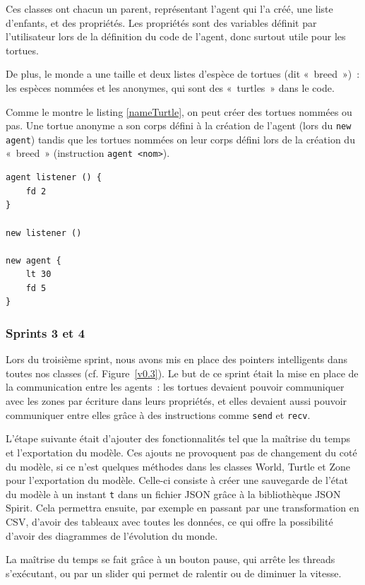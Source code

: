 Ces classes ont chacun un parent, représentant l'agent qui l'a créé, une liste d'enfants, et des propriétés. Les propriétés sont des variables définit par l'utilisateur lors de la définition du code de l'agent, donc surtout utile pour les tortues.

De plus, le monde a une taille et deux listes d'espèce de tortues (dit «~breed~»)~: les espèces nommées et les anonymes, qui sont des «~turtles~» dans le code.

Comme le montre le listing \ref{nameTurtle}, on peut créer des tortues nommées ou pas. Une tortue anonyme a son corps défini à la création de l'agent (lors du \verb|new agent|) tandis que les tortues nommées on leur corps défini lors de la création du «~breed~» (instruction \verb|agent <nom>|).

\begin{lstlisting}[label=nameTurtle,caption=Nommage lors de la création d'une tortue]
agent listener () {
	fd 2
}

new listener ()

new agent {
	lt 30
	fd 5
}
\end{lstlisting}

\subsubsection{Sprints 3 et 4}
Lors du troisième sprint, nous avons mis en place des pointers intelligents dans toutes nos classes (cf. Figure~\ref{v0.3}). Le but de ce sprint était la mise en place de la communication entre les agents~: les tortues devaient pouvoir communiquer avec les zones par écriture dans leurs propriétés, et elles devaient aussi pouvoir communiquer entre elles grâce à des instructions comme \verb|send| et \verb|recv|.

L'étape suivante était d'ajouter des fonctionnalités tel que la maîtrise du temps et l'exportation du modèle. Ces ajouts ne provoquent pas de changement du coté du modèle, si ce n'est quelques méthodes dans les classes World, Turtle et Zone pour l'exportation du modèle.
Celle-ci consiste à créer une sauvegarde de l'état du modèle à un instant \verb|t| dans un fichier JSON grâce à la bibliothèque JSON Spirit.
Cela permettra ensuite, par exemple en passant par une transformation en CSV, d'avoir des tableaux avec toutes les données, ce qui offre la possibilité d'avoir des diagrammes de l'évolution du monde.

La maîtrise du temps se fait grâce à un bouton pause, qui arrête les threads s'exécutant, ou par un slider qui permet de ralentir ou de diminuer la vitesse.

